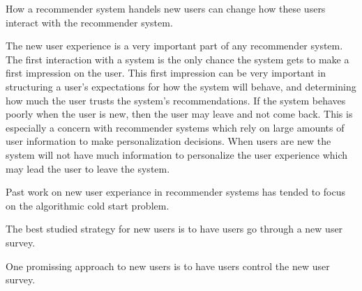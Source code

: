 \documentclass[letterpaper]{sig-alternate}
\begin{document}
  

  How a recommender system handels new users can change how these users interact with the recommender system.

  The new user experience is a very important part of any recommender system.
  The first interaction with a system is the only chance the system gets to make a first impression on the user.
  This first impression can be very important in structuring a user's expectations for how the system will behave, and determining how much the user trusts the system's recommendations.
  If the system behaves poorly when the user is new, then the user may leave and not come back.
  This is especially a concern with recommender systems which rely on large amounts of user information to make personalization decisions.
  When users are new the system will not have much information to personalize the user experience which may lead the user to leave the system.


  Past work on new user experiance in recommender systems has tended to focus on the algorithmic cold start problem.


  The best studied strategy for new users is to have users go through a new user survey.

  One promissing approach to new users is to have users control the new user survey.


\end{document}
